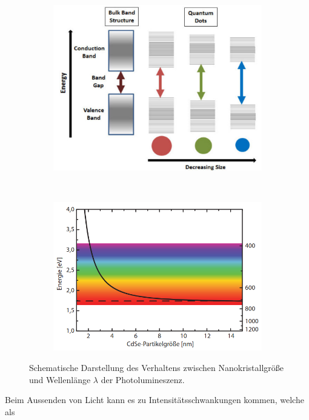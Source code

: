 \begin{figure}[H]
\centering
	\begin{subfigure}[t]{0.4\textwidth}
	\includegraphics[width=\textwidth]{Abb/size.png}
	\end{subfigure}
	~
	\begin{subfigure}[t]{0.4\textwidth}
	\includegraphics[width=\textwidth]{Abb/size2.png}
	\end{subfigure}
	\caption{Schematische Darstellung des Verhaltens zwischen Nanokristallgröße und
	Wellenlänge $\lambda$ der Photolumineszenz\cite{size}\cite{blink}.}
\label{fig:size}
\end{figure}
\noindent
Beim Aussenden von Licht kann es zu Intensitätsschwankungen kommen, welche als
